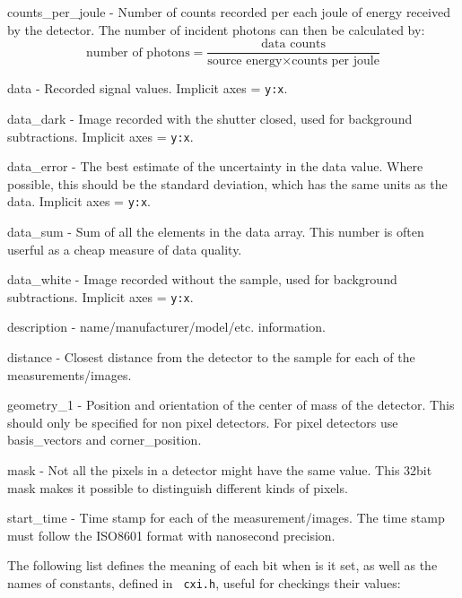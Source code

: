 \documentclass[usletter,11pt]{article}
\newcommand{\member}[2]
{ \noindent
{ \color{softBlue}  #1 - } #2
\vspace{0.2cm}
}
\begin{document}
\member{counts\_per\_joule}{Number of counts recorded per each joule of
  energy received by the detector. The number of incident photons can
  then be calculated by:
\begin{equation*}
\text{number of photons} = \frac{\text{data counts}}{\text{source energy} \times \text{counts per joule}}
\end{equation*}
}

\member{data}{Recorded signal values. Implicit axes = {\tt y:x}.}

\member{data\_dark}{Image recorded with the shutter closed, used for
 background subtractions. Implicit axes = {\tt y:x}.}

\member{data\_error}{The best estimate of the uncertainty in the data
value. Where possible, this should be the standard deviation, which
has the same units as the data. Implicit axes = {\tt y:x}.}

\member{data\_sum}{Sum of all the elements in the data array. This
  number is often userful as a cheap measure of data quality.}

\member{data\_white}{Image recorded without the sample, used for
 background subtractions. Implicit axes = {\tt y:x}.}

\member{description}{name/manufacturer/model/etc. information.}

\member{distance}{Closest distance from the detector to
the sample for each of the measurements/images.}

\member{geometry\_1}{Position and orientation of the center of mass of
  the detector. This should only be specified for non pixel
  detectors. For pixel detectors use basis\_vectors and
  corner\_position.}

\member{mask}{Not all the pixels in a detector might have the same
  value. This 32bit mask makes it possible to distinguish different
  kinds of pixels.}

\member{start\_time}{Time stamp for each of the measurement/images.
	The time stamp must follow the ISO8601 format with nanosecond
	precision.}

The following list defines the meaning of each
bit when is it set, as well as the names of constants, defined in {\tt
cxi.h}, useful for
checkings their values:
\end{document}
